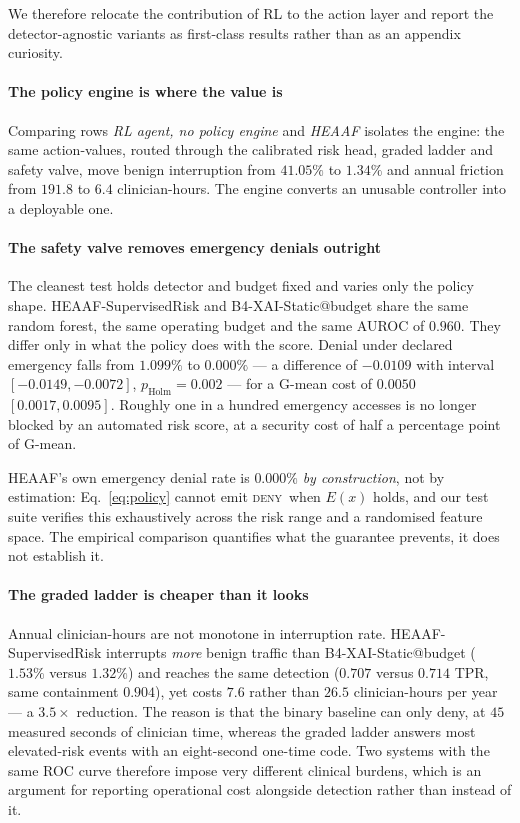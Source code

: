 \documentclass[conference]{IEEEtran}
\newcommand{\deny}{\textsc{deny}}
\begin{document}
We therefore relocate the contribution of RL to the action layer and report the
detector-agnostic variants as first-class results rather than as an appendix
curiosity.

\paragraph{The policy engine is where the value is}
Comparing rows \emph{RL agent, no policy engine} and \emph{HEAAF} isolates the
engine: the same action-values, routed through the calibrated risk head,
graded ladder and safety valve, move benign interruption from $41.05\%$ to
$1.34\%$ and annual friction from $191.8$ to $6.4$ clinician-hours. The engine
converts an unusable controller into a deployable one.

\paragraph{The safety valve removes emergency denials outright}
The cleanest test holds detector and budget fixed and varies only the policy
shape. HEAAF-SupervisedRisk and B4-XAI-Static@budget share the same random
forest, the same operating budget and the same AUROC of $0.960$. They differ
only in what the policy does with the score. Denial under declared emergency
falls from $1.099\%$ to $0.000\%$ --- a difference of $-0.0109$ with interval
$[-0.0149, -0.0072]$, $p_{\text{Holm}}=0.002$ --- for a G-mean cost of
$0.0050$ $[0.0017, 0.0095]$. Roughly one in a hundred emergency accesses is no
longer blocked by an automated risk score, at a security cost of half a
percentage point of G-mean.

HEAAF's own emergency denial rate is $0.000\%$ \emph{by construction}, not by
estimation: Eq.~\eqref{eq:policy} cannot emit \deny\ when $E(x)$ holds, and our
test suite verifies this exhaustively across the risk range and a randomised
feature space. The empirical comparison quantifies what the guarantee prevents,
it does not establish it.

\paragraph{The graded ladder is cheaper than it looks}
Annual clinician-hours are not monotone in interruption rate.
HEAAF-SupervisedRisk interrupts \emph{more} benign traffic than
B4-XAI-Static@budget ($1.53\%$ versus $1.32\%$) and reaches the same detection
($0.707$ versus $0.714$ TPR, same containment $0.904$), yet costs $7.6$ rather
than $26.5$ clinician-hours per year --- a $3.5\times$ reduction. The reason is
that the binary baseline can only deny, at $45$ measured seconds of clinician
time, whereas the graded ladder answers most elevated-risk events with an
eight-second one-time code. Two systems with the same ROC curve therefore
impose very different clinical burdens, which is an argument for reporting
operational cost alongside detection rather than instead of it.
\end{document}
